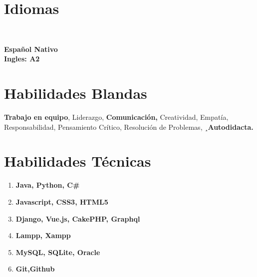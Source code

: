 \documentclass[american]{cv-class}
\begin{document}
\begin{aside}
    
    \section{Idiomas}
    \\
    \begin{small}
    \textbf{Español Nativo}
    \\
    \textbf{Ingles: A2 }

    \end{small}
	
\section{Habilidades Blandas}

	\justifying
   \begin{small}
    	{ \textbf{Trabajo en equipo}, Liderazgo, \textbf{Comunicación,} Creatividad, Empatía, Responsabilidad, Pensamiento Crítico, Resolución de Problemas, ¸\textbf{Autodidacta.}
    	}
    \end{small}
    
\section{Habilidades Técnicas}

	\justifying
    \begin{enumerate}
    
    \item \textbf{Java, Python, C\# }
    \item  \textbf{Javascript, CSS3, HTML5}
    \item  \textbf{Django, Vue.js, CakePHP, Graphql}
    \item \textbf{Lampp, Xampp}
    \item  \textbf{MySQL, SQLite, Oracle}
    \item \textbf{Git,Github}
    
    \end{enumerate}
\end{aside}

 

\end{document}
